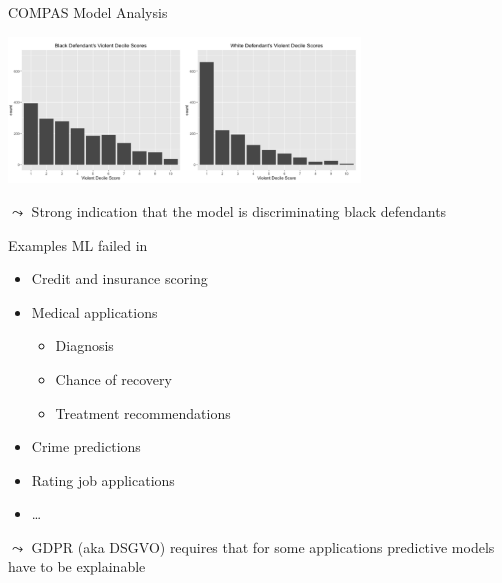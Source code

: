 \documentclass[11pt,compress,t,notes=noshow, aspectratio=169, xcolor=table]{beamer}
\begin{document}
\begin{frame}{COMPAS Model Analysis~}

    \centering
    \includegraphics[width=0.7\textwidth]{figure/compass_black_white.PNG}

	$\leadsto$ Strong indication that the model is discriminating black defendants

\end{frame}

\begin{frame}{Examples ML failed in}

    \begin{itemize}
        \item Credit and insurance scoring

        \item Medical applications
        \begin{itemize}
            \item Diagnosis
            \item Chance of recovery
            \item Treatment recommendations
        \end{itemize}

        \item Crime predictions

        \item Rating job applications

        \item \ldots
    \end{itemize}


    \bigskip

    $\leadsto$ GDPR (aka DSGVO) requires that for some applications predictive models have to be explainable

\end{frame}
\end{document}
